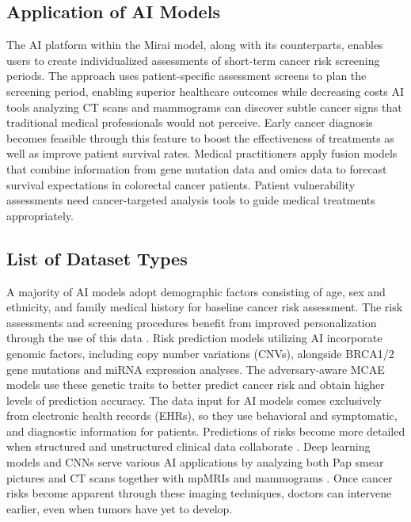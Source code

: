 \documentclass[conference]{IEEEtran}
\begin{document}
\subsection{Application of AI Models}

The AI platform within the Mirai model, along with its counterparts, enables users to create individualized assessments of short-term cancer risk screening periods. The approach uses patient-specific assessment screens to plan the screening period, enabling superior healthcare outcomes while decreasing costs \cite{2,10}
AI tools analyzing CT scans and mammograms \cite{1,2,3} can discover subtle cancer signs that traditional medical professionals would not perceive. Early cancer diagnosis becomes feasible through this feature to boost the effectiveness of treatments as well as improve patient survival rates.
Medical practitioners apply fusion models that combine information from gene mutation data \cite{3} and omics data \cite{7} to forecast survival expectations in colorectal cancer patients. Patient vulnerability assessments need cancer-targeted analysis tools to guide medical treatments appropriately.


\subsection{List of Dataset Types}
A majority of AI models adopt demographic factors consisting of age, sex and ethnicity, and family medical history for baseline cancer risk assessment. The risk assessments and screening procedures benefit from improved personalization through the use of this data \cite{2,10}.
Risk prediction models utilizing AI incorporate genomic factors, including copy number variations (CNVs), alongside BRCA1/2 gene mutations and miRNA expression analyses. The adversary-aware MCAE models \cite{7} use these genetic traits to better predict cancer risk and obtain higher levels of prediction accuracy.
The data input for AI models comes exclusively from electronic health records (EHRs), so they use behavioral and symptomatic, and diagnostic information for patients. Predictions of risks become more detailed when structured and unstructured clinical data collaborate \cite{12}.
Deep learning models and CNNs serve various AI applications by analyzing both Pap smear pictures \cite{7} and CT scans \cite{3} together with mpMRIs \cite{6} and mammograms \cite{2,10} . Once cancer risks become apparent through these imaging techniques, doctors can intervene earlier, even when tumors have yet to develop.
\end{document}

